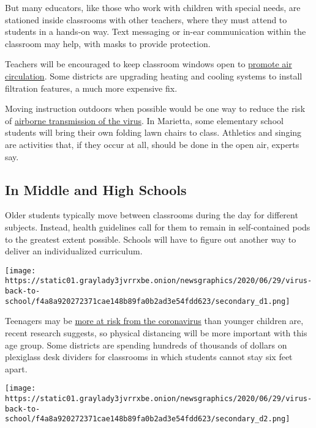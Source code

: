 But many educators, like those who work with children with special
needs, are stationed inside classrooms with other teachers, where they
must attend to students in a hands-on way. Text messaging or in-ear
communication within the classroom may help, with masks to provide
protection.

Teachers will be encouraged to keep classroom windows open to
\href{https://www.nytimes3xbfgragh.onion/2020/07/06/health/coronavirus-airborne-aerosols.html}{promote
air circulation}. Some districts are upgrading heating and cooling
systems to install filtration features, a much more expensive fix.

Moving instruction outdoors when possible would be one way to reduce the
risk of
\href{https://www.nytimes3xbfgragh.onion/2020/07/06/health/coronavirus-airborne-aerosols.html}{airborne
transmission of the virus}. In Marietta, some elementary school students
will bring their own folding lawn chairs to class. Athletics and singing
are activities that, if they occur at all, should be done in the open
air, experts say.

\hypertarget{in-middle-and-high-schools}{%
\subsection{In Middle and High
Schools}\label{in-middle-and-high-schools}}

Older students typically move between classrooms during the day for
different subjects. Instead, health guidelines call for them to remain
in self-contained pods to the greatest extent possible. Schools will
have to figure out another way to deliver an individualized curriculum.

\texttt{[image: https://static01.graylady3jvrrxbe.onion/newsgraphics/2020/06/29/virus-back-to-school/f4a8a920272371cae148b89fa0b2ad3e54fdd623/secondary\_d1.png]}

Teenagers may be
\href{https://www.nytimes3xbfgragh.onion/2020/07/18/health/coronavirus-children-schools.html}{more
at risk from the coronavirus} than younger children are, recent research
suggests, so physical distancing will be more important with this age
group. Some districts are spending hundreds of thousands of dollars on
plexiglass desk dividers for classrooms in which students cannot stay
six feet apart.

\texttt{[image: https://static01.graylady3jvrrxbe.onion/newsgraphics/2020/06/29/virus-back-to-school/f4a8a920272371cae148b89fa0b2ad3e54fdd623/secondary\_d2.png]}

